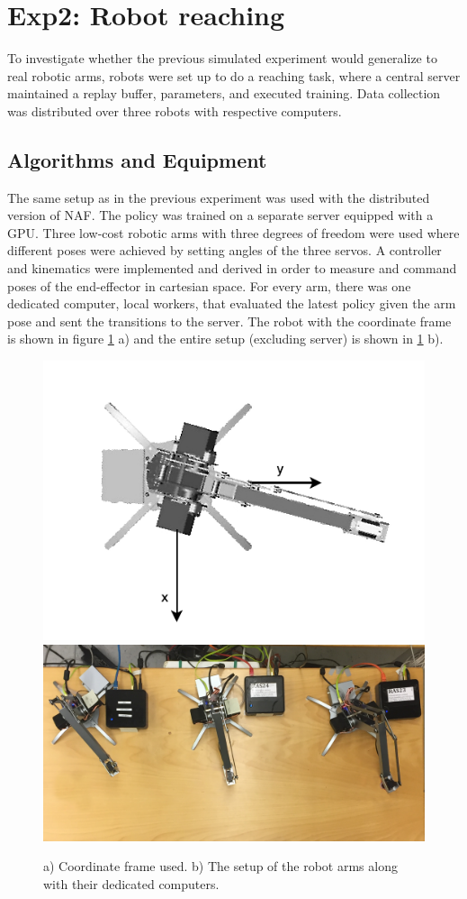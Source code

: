 \section{Exp2: Robot reaching}

To investigate whether the previous simulated experiment would generalize to
real robotic arms, robots were set up to do a reaching task, where a central
server maintained a replay buffer, parameters, and executed training. Data
collection was distributed over three robots with respective computers.

\subsection{Algorithms and Equipment}

The same setup as in the previous experiment was used with the distributed
version of NAF. The policy was trained on a separate server equipped with a
GPU. Three low-cost robotic arms with three degrees of freedom were used where
different poses were achieved by setting angles of the three servos. A
controller and kinematics were implemented and derived in order to measure and
command poses of the end-effector in cartesian space. For every arm, there was
one dedicated computer, local workers, that evaluated the latest policy given
the arm pose and sent the transitions to the server. The robot with the
coordinate frame is shown in figure \ref{fig:uarm_coordinate_frame} a) and the
entire setup (excluding server) is shown in \ref{fig:uarm_coordinate_frame} b).

\begin{figure}[ht]
    \centering
    \includegraphics[width=0.39 \textwidth]{res/uarm_coordinates.pdf}
    \includegraphics[width=0.59 \textwidth]{res/uarm_moving_setup.png}

    \caption{a) Coordinate frame used. b) The setup of the robot arms along
    with their dedicated computers.}

    \label{fig:uarm_coordinate_frame}
    
\end{figure}

